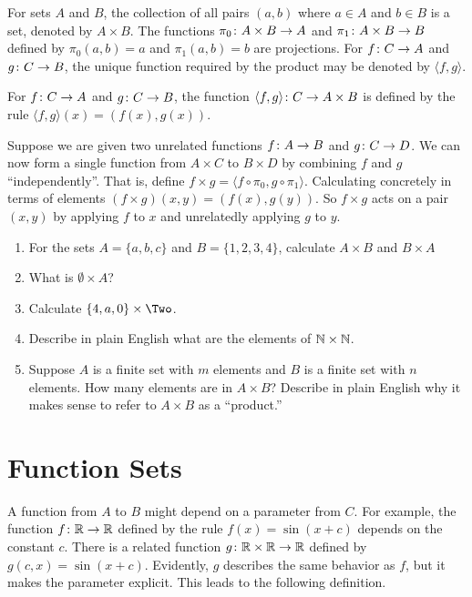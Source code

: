 \begin{principle}\label{ax:products}
	For sets $A$ and $B$, the collection of all pairs $(a,b)$ where $a\in A$ and $b\in B$ is a set, denoted by $A\times B$. 
	The functions ${\pi_0}\colon{A\times B}\to{A}$ and ${\pi_1}\colon{A\times B}\to{B}$ defined by $\pi_0(a,b)=a$
	and $\pi_1(a,b)=b$ are projections. For ${f}\colon{C}\to{A}$ and ${g}\colon{C}\to{B}$, the unique function required by
	the product may be denoted by $\langle f,g\rangle$.

	For ${f}\colon{C}\to{A}$ and ${g}\colon{C}\to{B}$, the function ${\langle f,g\rangle}\colon{C}\to{A\times B}$ is defined by the rule $\langle f,g\rangle(x)=(f(x),g(x))$.
\end{principle}

Suppose we are given two unrelated functions ${f}\colon{A}\to{B}$ and ${g}\colon{C}\to{D}$. 
We can now form a single function from $A\times C$ to $B\times D$ by combining $f$ and $g$ ``independently''. 
That is, define $f\times g = \langle f\circ \pi_0,g\circ \pi_1\rangle$.
Calculating concretely in terms of elements $(f\times g)(x,y) = (f(x),g(y))$. 
So $f\times g$ acts on a pair $(x,y)$ by applying $f$ to $x$ and unrelatedly applying $g$ to $y$. 

\begin{exercises}
	\begin{enumerate}
		\item For the sets $A = \{a,b,c\}$ and $B = \{1,2,3,4\}$, calculate $A\times B$ and $B\times A$
		\item What is $\emptyset \times A$? 
		\item Calculate $\{4,a,0\}\times \Two$.
		\item Describe in plain English what are the elements of $\mathbb N\times \mathbb N$.
		\item Suppose $A$ is a finite set with $m$ elements and $B$ is a finite set with $n$ elements.
		How many elements are in $A\times B$?
		Describe in plain English why it makes sense to refer to $A\times B$ as a ``product.''
	\end{enumerate}
\end{exercises}

\section{Function Sets}

A function from $A$ to $B$ might depend on a parameter from $C$. 
For example, the function ${f}\colon{\mathbb R}\to{\mathbb R}$ defined by the rule $f(x) = \sin(x + c)$ depends on the constant $c$.
There is a related function ${g}\colon{\mathbb R\times \mathbb R}\to{\mathbb R}$ defined by $g(c,x) = \sin(x+c)$.
Evidently, $g$ describes the same behavior as $f$, but it makes the parameter explicit.
This leads to the following definition.

